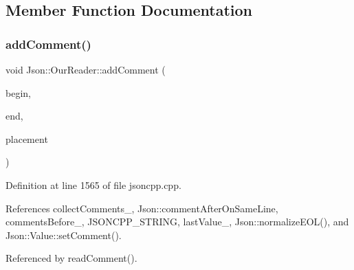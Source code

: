 \subsection{Member Function Documentation}
\mbox{\label{class_json_1_1_our_reader_ad7318c37469a9106069a236fb4b10e1f}} 
\subsubsection{\texorpdfstring{add\+Comment()}{addComment()}}
{\footnotesize\ttfamily void Json\+::\+Our\+Reader\+::add\+Comment (\begin{DoxyParamCaption}\item[{\hyperlink{class_json_1_1_our_reader_a1bdc7bbc52ba87cae6b19746f2ee0189}{Location}}]{begin,  }\item[{\hyperlink{class_json_1_1_our_reader_a1bdc7bbc52ba87cae6b19746f2ee0189}{Location}}]{end,  }\item[{\hyperlink{namespace_json_a4fc417c23905b2ae9e2c47d197a45351}{Comment\+Placement}}]{placement }\end{DoxyParamCaption})\hspace{0.3cm}{\ttfamily [private]}}



Definition at line 1565 of file jsoncpp.\+cpp.



References collect\+Comments\+\_\+, Json\+::comment\+After\+On\+Same\+Line, comments\+Before\+\_\+, J\+S\+O\+N\+C\+P\+P\+\_\+\+S\+T\+R\+I\+NG, last\+Value\+\_\+, Json\+::normalize\+E\+O\+L(), and Json\+::\+Value\+::set\+Comment().



Referenced by read\+Comment().



